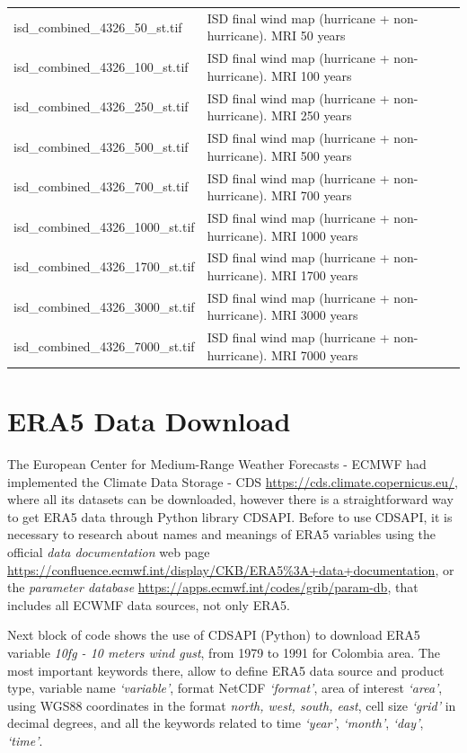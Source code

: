 \documentclass[12pt,twoside]{reedthesis}
\begin{document}
\begin{longtable}[t]{>{\raggedright\arraybackslash}p{2in}>{\raggedright\arraybackslash}p{3.5in}}
isd\_combined\_4326\_50\_st.tif & ISD final wind map (hurricane + non-hurricane). MRI 50 years\\
isd\_combined\_4326\_100\_st.tif & ISD final wind map (hurricane + non-hurricane). MRI 100 years\\
isd\_combined\_4326\_250\_st.tif & ISD final wind map (hurricane + non-hurricane). MRI 250 years\\
isd\_combined\_4326\_500\_st.tif & ISD final wind map (hurricane + non-hurricane). MRI 500 years\\
isd\_combined\_4326\_700\_st.tif & ISD final wind map (hurricane + non-hurricane). MRI 700 years\\
isd\_combined\_4326\_1000\_st.tif & ISD final wind map (hurricane + non-hurricane). MRI 1000 years\\
isd\_combined\_4326\_1700\_st.tif & ISD final wind map (hurricane + non-hurricane). MRI 1700 years\\
isd\_combined\_4326\_3000\_st.tif & ISD final wind map (hurricane + non-hurricane). MRI 3000 years\\
isd\_combined\_4326\_7000\_st.tif & ISD final wind map (hurricane + non-hurricane). MRI 7000 years\\
\bottomrule
\end{longtable}
\endgroup{}

\hypertarget{datadownload}{%
\chapter{ERA5 Data Download}\label{datadownload}}

The European Center for Medium-Range Weather Forecasts - ECMWF had implemented the Climate Data Storage - CDS \url{https://cds.climate.copernicus.eu/}, where all its datasets can be downloaded, however there is a straightforward way to get ERA5 data through Python library CDSAPI. Before to use CDSAPI, it is necessary to research about names and meanings of ERA5 variables using the official \emph{data documentation} web page \url{https://confluence.ecmwf.int/display/CKB/ERA5\%3A+data+documentation}, or the \emph{parameter database} \url{https://apps.ecmwf.int/codes/grib/param-db}, that includes all ECWMF data sources, not only ERA5.

Next block of code shows the use of CDSAPI (Python) to download ERA5 variable \emph{10fg - 10 meters wind gust}, from 1979 to 1991 for Colombia area. The most important keywords there, allow to define ERA5 data source and product type, variable name \emph{`variable'}, format NetCDF \emph{`format'}, area of interest \emph{`area'}, using WGS88 coordinates in the format \emph{north, west, south, east}, cell size \emph{`grid'} in decimal degrees, and all the keywords related to time \emph{`year'}, \emph{`month'}, \emph{`day'}, \emph{`time'}.
\end{document}
